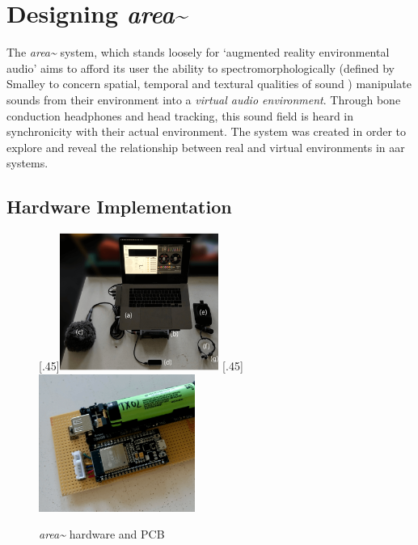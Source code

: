 \section{Designing \textit{area\textasciitilde{}}}\label{sec: area-system}
The \textit{\textit{area\textasciitilde{}}} system, which stands loosely for `augmented reality environmental audio' aims to afford its user the ability to spectromorphologically (defined by Smalley to concern spatial, temporal and textural qualities of sound \citeyearpar{smalley1997}) manipulate sounds from their environment into a \textit{virtual audio environment}. Through bone conduction headphones and head tracking, this sound field is heard in synchronicity with their actual environment. The system was created in order to explore and reveal the relationship between real and virtual environments in \gls{aar} systems.

\subsection{Hardware Implementation}\label{sec: area-system-hardware}
\begin{figure}
    \centering
    \subcaptionbox{}[.45\textwidth]{\includegraphics[height=4.5cm]{figures/05-area/areatechnical_hardware.png}}
    \hfill
    \subcaptionbox{}[.45\textwidth]{\includegraphics[height=4.5cm]{figures/05-area/areatechnical_pcb.png}}%
    \caption{\textit{area\textasciitilde{}} hardware and PCB}
    \label{fig: areatechnical}
\end{figure}

